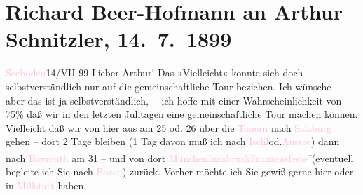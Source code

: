 

               \section[Richard Beer-Hofmann an Arthur Schnitzler, 14. 7. 1899]{ Richard Beer-Hofmann an Arthur Schnitzler, 14. 7. 1899}\nopagebreak{}\rehead{ }\normalsize\beginnumbering{} \toendnotes[C]{\smallbreak\pagebreak[2]} 
\toendnotes[C]{\smallbreak}\pstart
           \centering{}{\pb}\textcolor{pink}{Seeboden}{}\ledrightnote{\textcolor{pink}{Seeboden}}{ }14/VII 99\pend
           \pstart
           Lieber Arthur! Das »Vielleicht« konnte sich doch selbstverständlich
               nur auf die gemeinschaftliche Tour beziehen. Ich wünsche – aber das ist ja
               selbstverständlich, – ich hoffe mit einer Wahrscheinlichkeit von 75{\%} daß wir in den letzten Julitagen eine gemeinschaftliche
               Tour machen können. Vielleicht daß wir von hier aus {\pb}am 25 od.
                  26 über die \textcolor{pink}{Tauern}{}\ledrightnote{\textcolor{pink}{Hohe Tauern}} nach \textcolor{pink}{Salzburg}{}\ledrightnote{\textcolor{pink}{Salzburg}}{ } gehen – dort 2 Tage bleiben (1 Tag davon muß ich nach
                  \textcolor{pink}{Ischl}{}\ledrightnote{\textcolor{pink}{Bad Ischl}}{ }\introOben{}od.\introOben{}{ }\textcolor{pink}{Aussee}{}\ledrightnote{\textcolor{pink}{Bad Aussee}}) dann nach \textcolor{pink}{Bayreuth}{}\ledrightnote{\textcolor{pink}{Bayreuth}} am 31 – und von dort \textcolor{pink}{München}{}\ledrightnote{\textcolor{pink}{München}}{ }\textcolor{pink}{Innsbruck}{}\ledrightnote{\textcolor{pink}{Innsbruck}}{ }\textcolor{pink}{Franzensfeste}{}\ledrightnote{\textcolor{pink}{Franzensfeste}}\substVorne{}\textsuperscript{–}\substDazwischen{}(\substHinten{}eventuell begleite ich Sie nach \textcolor{pink}{Bozen}{}\ledrightnote{\textcolor{pink}{Bozen}}\introOben{})\introOben{} zurück. Vorher möchte ich Sie gewiß gerne hier oder in \textcolor{pink}{Millstatt}{}\ledrightnote{\textcolor{pink}{Millstatt}} haben.\pend
